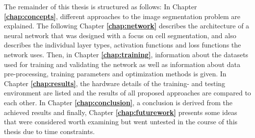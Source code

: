 \noindent The remainder of this thesis is structured as follows: In Chapter \textbf{\ref{chap:concepts}}, different approaches to the image segmentation problem are explained. The following Chapter \textbf{\ref{chap:network}} describes the architecture of a neural network that was designed with a focus on cell segmentation, and also describes the individual layer types, activation functions and loss functions the network uses. Then, in Chapter \textbf{\ref{chap:training}}, information about the datasets used for training and validating the network as well as information about data pre-processing, training parameters and optimization methods is given. In Chapter \textbf{\ref{chap:results}}, the hardware details of the training- and testing environment are listed and the results of all proposed approaches are compared to each other. In Chapter \textbf{\ref{chap:conclusion}}, a conclusion is derived from the achieved results and finally, Chapter \textbf{\ref{chap:futurework}} presents some ideas that were considered worth examining but went untested in the course of this thesis due to time constraints. 